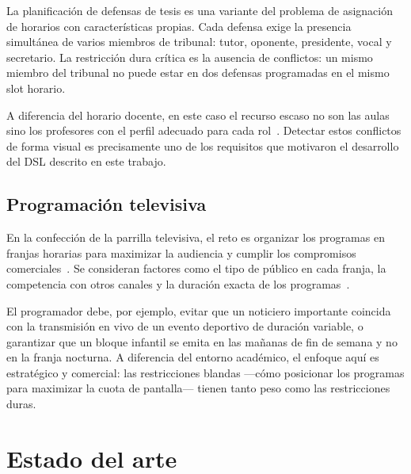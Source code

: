 La planificación de defensas de tesis es una variante del problema de
asignación de horarios con características propias.  Cada defensa exige la
presencia simultánea de varios miembros de tribunal: tutor, oponente,
presidente, vocal y secretario.  La restricción dura crítica es la ausencia
de conflictos: un mismo miembro del tribunal no puede estar en dos defensas
programadas en el mismo slot horario.

A diferencia del horario docente, en este caso el recurso escaso no son las
aulas sino los profesores con el perfil adecuado para cada rol~\cite{nardo2019}.
Detectar estos conflictos de forma visual es precisamente uno de los
requisitos que motivaron el desarrollo del DSL descrito en este trabajo.

\subsection{Programaci\'on televisiva}
\label{ssec:horario-tv}

En la confección de la parrilla televisiva, el reto es organizar los programas
en franjas horarias para maximizar la audiencia y cumplir los compromisos
comerciales~\cite{bollapragada2002}.  Se consideran factores como el tipo de
público en cada franja, la competencia con otros canales y la duración exacta
de los programas~\cite{fernandez2008}.

El programador debe, por ejemplo, evitar que un noticiero importante coincida
con la transmisión en vivo de un evento deportivo de duración variable, o
garantizar que un bloque infantil se emita en las mañanas de fin de semana y
no en la franja nocturna.  A diferencia del entorno académico, el enfoque
aquí es estratégico y comercial: las restricciones blandas ---cómo posicionar
los programas para maximizar la cuota de pantalla--- tienen tanto peso como
las restricciones duras.

\section{Estado del arte}
\label{sec:estadoarte-horarios}

